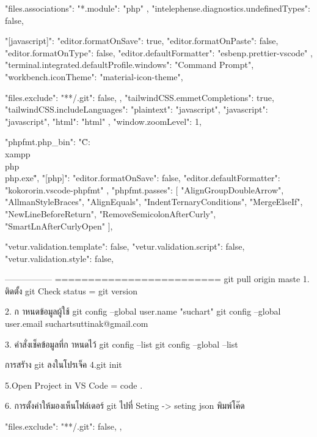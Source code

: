 {
    "files.associations": { "*.module": "php" },
    "intelephense.diagnostics.undefinedTypes": false,

    "[javascript]": {
        "editor.formatOnSave": true,
        "editor.formatOnPaste": false,
        "editor.formatOnType": false,
        "editor.defaultFormatter": "esbenp.prettier-vscode"
        },
        "terminal.integrated.defaultProfile.windows": "Command Prompt",
        "workbench.iconTheme": "material-icon-theme",
        
        
            "files.exclude": {
                "**/.git": false,
            },
            "tailwindCSS.emmetCompletions": true,
            "tailwindCSS.includeLanguages": {
            "plaintext": "javascript",
            "javascript": "javascript",
            "html": "html"
    },
            "window.zoomLevel": 1, 
          
            "phpfmt.php_bin": "\"C:\\xampp\\php\\php.exe\"",
            "[php]": {
                "editor.formatOnSave": false,
                "editor.defaultFormatter": "kokororin.vscode-phpfmt"
            },
            "phpfmt.passes": [
                "AlignGroupDoubleArrow",
                "AllmanStyleBraces",
                "AlignEquals",
                "IndentTernaryConditions",
                "MergeElseIf",
                "NewLineBeforeReturn",
                "RemoveSemicolonAfterCurly",
                "SmartLnAfterCurlyOpen"
            ],

            "vetur.validation.template": false,
            "vetur.validation.script": false,
            "vetur.validation.style": false,
            
            -----------------
            =========================
git pull origin maste
1. ติดตั้ง git
 Check status = git version

2. ก าหนดข้อมูลผู้ใช้
git config --global user.name "suchart"
git config --global user.email suchartsuttinak@gmail.com

3. คำสั่งเช็คข้อมูลที่ก าหนดไว้
git config --list
git config --global --list

การสรัาง git ลงในโปรเจ็ค
4.git init

5.Open Project in VS Code
   = code .

6. การตั้งค่าให้มองเห็นโฟล์เดอร์ git 
 ไปที่ Seting -> seting json พิมพ์โค๊ด
{
"files.exclude": {
    "**/.git": false,
},

}}
